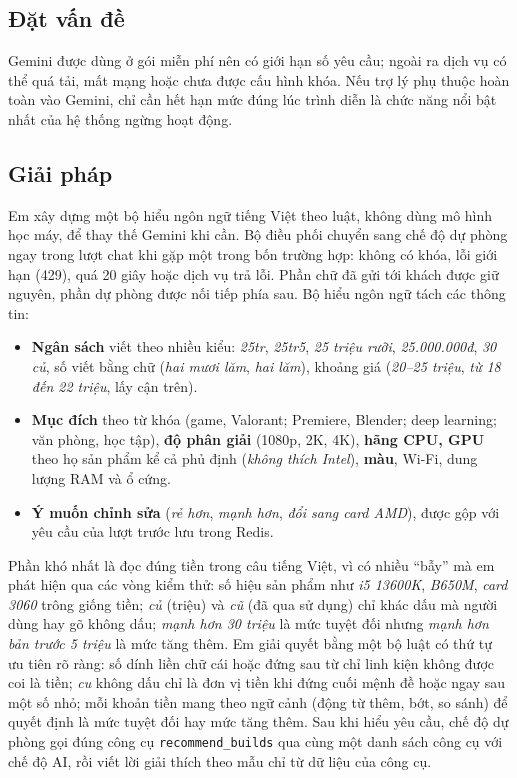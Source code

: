 \subsection{Đặt vấn đề}

Gemini được dùng ở gói miễn phí nên có giới hạn số yêu cầu; ngoài ra dịch vụ có thể quá tải, mất mạng hoặc chưa được cấu hình khóa. Nếu trợ lý phụ thuộc hoàn toàn vào Gemini, chỉ cần hết hạn mức đúng lúc trình diễn là chức năng nổi bật nhất của hệ thống ngừng hoạt động.

\subsection{Giải pháp}

Em xây dựng một bộ hiểu ngôn ngữ tiếng Việt theo luật, không dùng mô hình học máy, để thay thế Gemini khi cần. Bộ điều phối chuyển sang chế độ dự phòng ngay trong lượt chat khi gặp một trong bốn trường hợp: không có khóa, lỗi giới hạn (429), quá 20 giây hoặc dịch vụ trả lỗi. Phần chữ đã gửi tới khách được giữ nguyên, phần dự phòng được nối tiếp phía sau. Bộ hiểu ngôn ngữ tách các thông tin:
\begin{itemize}
  \item \textbf{Ngân sách} viết theo nhiều kiểu: \emph{25tr}, \emph{25tr5}, \emph{25 triệu rưỡi}, \emph{25.000.000đ}, \emph{30 củ}, số viết bằng chữ (\emph{hai mươi lăm}, \emph{hai lăm}), khoảng giá (\emph{20--25 triệu}, \emph{từ 18 đến 22 triệu}, lấy cận trên).
  \item \textbf{Mục đích} theo từ khóa (game, Valorant; Premiere, Blender; deep learning; văn phòng, học tập), \textbf{độ phân giải} (1080p, 2K, 4K), \textbf{hãng CPU, GPU} theo họ sản phẩm kể cả phủ định (\emph{không thích Intel}), \textbf{màu}, Wi-Fi, dung lượng RAM và ổ cứng.
  \item \textbf{Ý muốn chỉnh sửa} (\emph{rẻ hơn}, \emph{mạnh hơn}, \emph{đổi sang card AMD}), được gộp với yêu cầu của lượt trước lưu trong Redis.
\end{itemize}

Phần khó nhất là đọc đúng tiền trong câu tiếng Việt, vì có nhiều ``bẫy'' mà em phát hiện qua các vòng kiểm thử: số hiệu sản phẩm như \emph{i5 13600K}, \emph{B650M}, \emph{card 3060} trông giống tiền; \emph{củ} (triệu) và \emph{cũ} (đã qua sử dụng) chỉ khác dấu mà người dùng hay gõ không dấu; \emph{mạnh hơn 30 triệu} là mức tuyệt đối nhưng \emph{mạnh hơn bản trước 5 triệu} là mức tăng thêm. Em giải quyết bằng một bộ luật có thứ tự ưu tiên rõ ràng: số dính liền chữ cái hoặc đứng sau từ chỉ linh kiện không được coi là tiền; \emph{cu} không dấu chỉ là đơn vị tiền khi đứng cuối mệnh đề hoặc ngay sau một số nhỏ; mỗi khoản tiền mang theo ngữ cảnh (động từ thêm, bớt, so sánh) để quyết định là mức tuyệt đối hay mức tăng thêm. Sau khi hiểu yêu cầu, chế độ dự phòng gọi đúng công cụ \texttt{recommend\_builds} qua cùng một danh sách công cụ với chế độ AI, rồi viết lời giải thích theo mẫu chỉ từ dữ liệu của công cụ.

